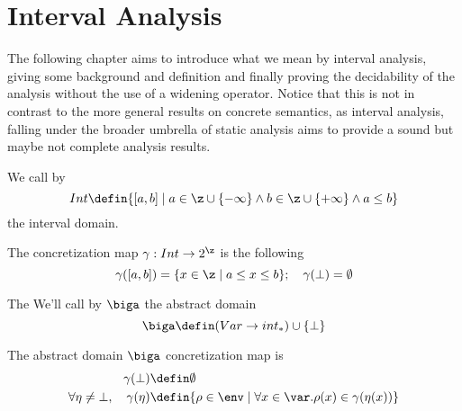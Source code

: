 \section{Interval Analysis}
The following chapter aims to introduce what we mean by interval
analysis, giving some background and definition and finally proving
the decidability of the analysis without the use of a widening
operator. Notice that this is not in contrast to the more general
results on concrete semantics, as interval analysis, falling under the
broader umbrella of static analysis aims to provide a sound but maybe
not complete analysis results.

\begin{definition}
  We call by \[Int \defin \{[a,b] \mid a \in \z \cup \{-\infty\}
  \wedge b \in \z \cup \{+\infty\} \wedge a \leq b\}\]
  the interval domain.
\end{definition}

\begin{definition}
  The concretization map \(\gamma : Int \to 2^\z\) is the
  following \[\gamma([a,b]) = \{x \in \z \mid a \leq x \leq b\}; \quad
  \gamma(\bot) = \emptyset\]
\end{definition}

\begin{definition}
  The We'll call by \(\biga\) the abstract domain \[\biga \defin (Var \to
  int_*) \cup \{\bot\}\]
\end{definition}

\begin{definition}
  The abstract domain \(\biga\) concretization map is
  \begin{align}
    \gamma(\bot) & \defin \emptyset \\ \forall \eta \neq \bot, \quad
    \gamma(\eta) & \defin \{\rho \in \env \mid \forall x \in \var
    . \rho(x) \in \gamma(\eta(x))\}
  \end{align}
\end{definition}
